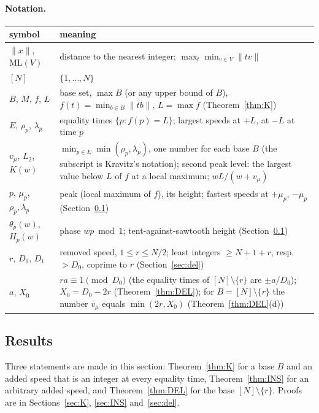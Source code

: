 \documentclass[11pt]{article}
\theoremstyle{definition}
\theoremstyle{remark}
\newcommand{\nd}[1]{\lVert #1\rVert}
\newcommand{\ML}{\mathrm{ML}}
\begin{document}
\begin{samepage}
\paragraph{Notation.}\nopagebreak
\begin{center}
\small
\begin{tabular}{l p{}}
\toprule
symbol & meaning \\
\midrule
$\nd{x}$, $\ML(V)$ & distance to the nearest integer; $\max_t\min_{v\in V}\nd{tv}$ \\
$[N]$ & $\{1,\dots,N\}$ \\
$B$, $M$, $f$, $L$ & base set, $\max B$ (or any upper bound of $B$), $f(t)=\min_{b\in B}\nd{tb}$, $L=\max f$ (Theorem~\ref{thm:K}) \\
$E$, $\rho_p$, $\lambda_p$ & equality times $\{p:f(p)=L\}$; largest speeds at $+L$, at $-L$ at time $p$ \\
$v_\mu$, $L_2$, $K(w)$ & $\min_{p\in E}\min(\rho_p,\lambda_p)$, one number for each base $B$ (the subscript is Kravitz's notation); second peak level: the largest value below $L$ of $f$ at a local maximum; $wL/(w+v_\mu)$ \\
$p$, $\mu_p$, $\rho_p,\lambda_p$ & peak (local maximum of $f$), its height; fastest speeds at $+\mu_p$, $-\mu_p$ (Section~\ref{sec:res}) \\
$\theta_p(w)$, $H_p(w)$ & phase $wp\bmod1$; tent-against-sawtooth height (Section~\ref{sec:res}) \\
$r$, $D_0$, $D_1$ & removed speed, $1\le r\le N/2$; least integers $\ge N+1+r$, resp.\ $>D_0$, coprime to $r$ (Section~\ref{sec:del}) \\
$a$, $X_0$ & $ra\equiv1\pmod{D_0}$ (the equality times of $[N]\setminus\{r\}$ are $\pm a/D_0$); $X_0=D_0-2r$ (Theorem~\ref{thm:DEL}); for $B=[N]\setminus\{r\}$ the number $v_\mu$ equals $\min(2r,X_0)$ (Theorem~\ref{thm:DEL}(d)) \\
\bottomrule
\end{tabular}
\end{center}
\end{samepage}

\subsection{Results}\label{sec:res}
Three statements are made in this section: Theorem~\ref{thm:K} for a base $B$ and an added speed that is an integer at every equality time, Theorem~\ref{thm:INS} for an arbitrary added speed, and Theorem~\ref{thm:DEL} for the base $[N]\setminus\{r\}$. Proofs are in Sections~\ref{sec:K}, \ref{sec:INS} and~\ref{sec:del}.
\end{document}
